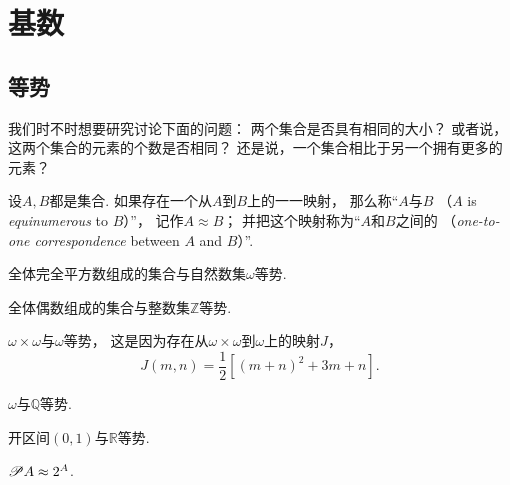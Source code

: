 \section{基数}
\subsection{等势}
我们时不时想要研究讨论下面的问题：
两个集合是否具有相同的大小？
或者说，这两个集合的元素的个数是否相同？
还是说，一个集合相比于另一个拥有更多的元素？

\begin{definition}
设\(A,B\)都是集合.
如果存在一个从\(A\)到\(B\)上的一一映射，
那么称“\(A\)与\(B\) （\(A\) is \emph{equinumerous} to \(B\)）”，
记作\(A \approx B\)；
并把这个映射称为“\(A\)和\(B\)之间的%
（\emph{one-to-one correspondence} between \(A\) and \(B\)）”.
\end{definition}

\begin{example}
全体完全平方数组成的集合与自然数集\(\omega\)等势.
\end{example}

\begin{example}
全体偶数组成的集合与整数集\(\mathbb{Z}\)等势.
\end{example}

\begin{example}
\(\omega\times\omega\)与\(\omega\)等势，
这是因为存在从\(\omega\times\omega\)到\(\omega\)上的映射\(J\)，
\[
	J(m,n) = \frac{1}{2} [(m+n)^2+3m+n].
\]
\end{example}

\begin{example}
\(\omega\)与\(\mathbb{Q}\)等势.
\end{example}

\begin{example}
开区间\((0,1)\)与\(\mathbb{R}\)等势.
\end{example}

\begin{example}
\(\mathscr{P} A \approx 2^A\).
\end{example}
